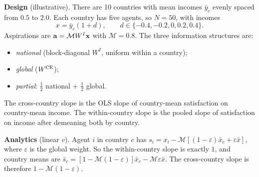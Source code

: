 \documentclass[../solutions_manual.tex]{subfiles}
\begin{document}
\textbf{Design} (illustrative). There are 10 countries with mean incomes $\bar y_c$ evenly spaced from $0.5$ to $2.0$. Each country has five agents, so $N = 50$, with incomes
\[
x = \bar y_c(1 + d), \qquad d \in \{-0.4, -0.2, 0, 0.2, 0.4\}.
\] Aspirations are $\mathbf{a} = \mathcal{M}W^I\mathbf{x}$ with $\mathcal{M} = 0.8$. The three information structures are:
\begin{itemize}
\item \emph{national} (block-diagonal $W^I$, uniform within a country);
\item \emph{global} ($W^{\text{CE}}$);
\item \emph{partial}: $\tfrac12$ national $+$ $\tfrac12$ global.
\end{itemize}
The cross-country slope is the OLS slope of country-mean satisfaction on country-mean income. The within-country slope is the pooled slope of satisfaction on income after demeaning both by country.

\textbf{Analytics} (linear $v$). Agent $i$ in country $c$ has $s_i = x_i - \mathcal{M}[(1-\varepsilon)\bar x_c + \varepsilon\bar x]$, where $\varepsilon$ is the global weight. So the within-country slope is exactly $1$, and country means are $\bar s_c = [1 - \mathcal{M}(1-\varepsilon)]\bar x_c - \mathcal{M}\varepsilon\bar x$. The cross-country slope is therefore $1 - \mathcal{M}(1-\varepsilon)$.
\end{document}
